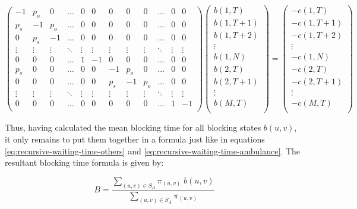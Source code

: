 \begin{equation}\label{eq:general-algebaric-approach-blocking-time}
    \begin{pmatrix}
        -1 & p_o & 0 & \dots & 0 & 0 & 0 & 0 & 0 & \dots & 0 & 0 \\ %
        p_s & -1 & p_o & \dots & 0 & 0 & 0 & 0 & 0 & \dots & 0 & 0 \\ %
        0 & p_s & -1 & \dots & 0 & 0 & 0 & 0 & 0 & \dots & 0 & 0 \\ %
        \vdots & \vdots & \vdots & \ddots & \vdots & \vdots & \vdots & \vdots & 
        \vdots & \ddots & \vdots & \vdots \\ 
        0 & 0 & 0 & \dots & 1 & -1 & 0 & 0 & 0 & \dots & 0 & 0 \\ %
        p_s & 0 & 0 & \dots & 0 & 0 & -1 & p_o & 0 & \dots & 0 & 0 \\ %
        0 & 0 & 0 & \dots & 0 & 0 & p_s & -1 & p_o & \dots & 0 & 0 \\ %
        \vdots & \vdots & \vdots & \ddots & \vdots & \vdots & \vdots & \vdots & 
        \vdots & \ddots & \vdots & \vdots \\ 
        0 & 0 & 0 & \dots & 0 & 0 & 0 & 0 & 0 & \dots & 1 & -1 \\ %
    \end{pmatrix}
    \begin{pmatrix}
        b(1,T) \\
        b(1,T+1) \\
        b(1,T+2) \\
        \vdots \\
        b(1,N) \\
        b(2,T) \\
        b(2,T+1) \\
        \vdots \\
        b(M,T) \\
    \end{pmatrix}
    = 
    \begin{pmatrix}
        -c(1,T) \\
        -c(1,T+1) \\
        -c(1,T+2) \\
        \vdots \\
        -c(1,N) \\
        -c(2,T) \\
        -c(2,T+1) \\
        \vdots \\
        -c(M,T) \\
    \end{pmatrix}
\end{equation}

Thus, having calculated the mean blocking time for all blocking states \(b(u,v)\), 
it only remains to put them together in a formula just like in equations 
\ref{eq:recursive-waiting-time-others} and \ref{eq:recursive-waiting-time-ambulance}.
The resultant blocking time formula is given by:

\begin{equation}\label{eq:algebraic-blocking-time}
    B = \frac{\sum_{(u,v) \in S_A} \pi_{(u,v)} \; b(u,v)}{\sum_{(u,v) \in S_A} \pi_{(u,v)}}
\end{equation}

